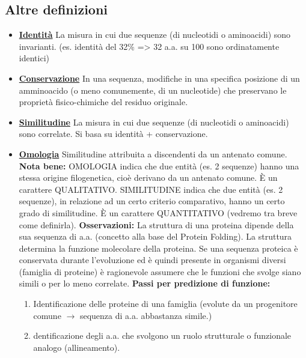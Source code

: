 \documentclass{article}
\begin{document}
\subsection{Altre definizioni}
\begin{itemize}
    \item \underline{\textbf{Identità}}
        \subitem La misura in cui due sequenze (di nucleotidi o aminoacidi) sono
        invarianti. (es. identità del 32\% => 32 a.a. su 100 sono
        ordinatamente identici)
    \item \underline{\textbf{Conservazione}}
        \subitem In una sequenza, modifiche in una specifica posizione di un
        amminoacido (o meno comunemente, di un nucleotide) che
        preservano le proprietà fisico-chimiche del residuo originale.
    \item \underline{\textbf{Similitudine}}
        \subitem La misura in cui due sequenze (di nucleotidi o aminoacidi)
        sono correlate. Si basa su identità + conservazione.
    \item \underline{\textbf{Omologia}}
        \subitem Similitudine attribuita a discendenti da un
        antenato comune.
        \subitem{!} \textbf{Nota bene:}
            \subsubitem{-} OMOLOGIA indica che due entità (es. 2 sequenze) hanno
            una stessa origine filogenetica, cioè derivano da un antenato
            comune. È un carattere QUALITATIVO.
            \subsubitem{-} SIMILITUDINE indica che due entità (es. 2 sequenze), in
            relazione ad un certo criterio comparativo, hanno un certo
            grado di similitudine. È un carattere QUANTITATIVO
            (vedremo tra breve come definirla).
        \subitem{!} \textbf{Osservazioni:}
            \subsubitem{-} La struttura di una proteina dipende della sua sequenza di a.a. (concetto alla
            base del Protein Folding).
            \subsubitem{-} La struttura determina la funzione molecolare della proteina.
            \subsubitem{-} Se una sequenza proteica è conservata durante l'evoluzione ed è quindi
            presente in organismi diversi (famiglia di proteine) è ragionevole assumere che le
            funzioni che svolge siano simili o per lo meno correlate.
        \subitem{!} \textbf{Passi per predizione di funzione:}
            \begin{enumerate}
                \item Identificazione delle proteine di una famiglia (evolute da un
                progenitore comune $\rightarrow$ sequenza di a.a. abbastanza simile.)
                \item dentificazione degli a.a. che svolgono un ruolo strutturale o
                funzionale analogo (allineamento).
            \end{enumerate}
\end{itemize}
\end{document}

